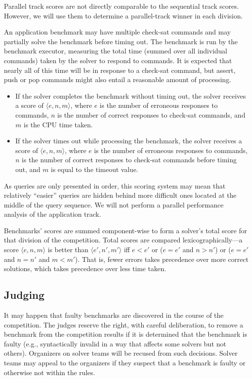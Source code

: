 \documentclass[12pt]{article}
\begin{document}
Parallel track scores are not directly comparable to the sequential track scores. However, we will use them to determine a parallel-track winner in each division.

An application benchmark may have multiple check-sat commands and may partially solve the benchmark before timing out.
The benchmark is run by the benchmark executor, measuring the total time (summed over all individual commands) taken by
the solver to respond to commands. It is expected that nearly all of this time will be in response to a check-sat command, but assert, push or pop commands might also entail a reasonable amount of processing.
\begin{itemize}
\item If the solver completes the benchmark without timing out, the solver receives a score of $\langle e,n,m\rangle$,
where $e$ is the number of erroneous responses to commands, $n$ is the number of correct responses to check-sat commands, and $m$ is the CPU time taken.
\item If the solver times out while processing the benchmark, the solver receives a score of $\langle e,n,m\rangle$,
where $e$ is the number of erroneous responses to commands, $n$ is the number of correct responses to check-sat commands before timing out, and $m$ is equal to the timeout value.
\end{itemize}

As queries are only presented in order, this scoring system may mean
that relatively ``easier'' queries are hidden behind more difficult
ones located at the middle of the query sequence. We will not perform a parallel performance analysis of the application track.

\label{scoring}
Benchmarks' scores are summed component-wise to form a solver's total
score for that division of the competition.
Total scores are compared lexicographically---a score $\langle e,n,m\rangle$ is better than 
$\langle e',n',m'\rangle$ iff $e < e'$ or ($e = e'$ and $n > n'$) or ($e = e'$ and $n = n'$ and $m < m'$).
That is, fewer errors takes precedence over more correct solutions, which takes precedence over less time taken.

\subsection{Judging}

It may happen that faulty benchmarks are discovered in the course of the competition. The judges reserve the right, with careful deliberation, to remove a benchmark from the competition
results if it is determined that the benchmark is faulty (e.g., syntactically invalid in a way that affects some solvers but not others). Organizers on solver teams will be recused from such decisions. Solver teams may appeal to the organizers if they suspect that a benchmark is faulty or otherwise not within the rules.
\end{document}
